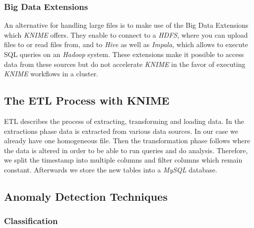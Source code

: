 \documentclass{dima}
\begin{document}

\subsubsection{Big Data Extensions}
An alternative for handling large files is to make use of the Big Data Extensions which \textit{KNIME} offers. They enable to connect to a \textit{HDFS}, where you can upload files to or read files from, and to \textit{Hive} as well as \textit{Impala}, which allows to execute SQL queries on an \textit{Hadoop} system. These extensions make it possible to access data from these sources but do not accelerate \textit{KNIME} in the favor of executing \textit{KNIME} workflows in a cluster.

\subsection{The ETL Process with KNIME}
ETL describes the process of extracting, transforming and loading data. In the extractions phase data is extracted from various data sources. In our case we already have one homogeneous file. Then the transformation phase follows where the data is altered in order to be able to run queries and do analysis. Therefore, we split the timestamp into multiple columns and filter columns which remain constant. Afterwards we store the new tables into a \textit{MySQL} database.


\subsection{Anomaly Detection Techniques}

\subsubsection{Classification}
\end{document}

